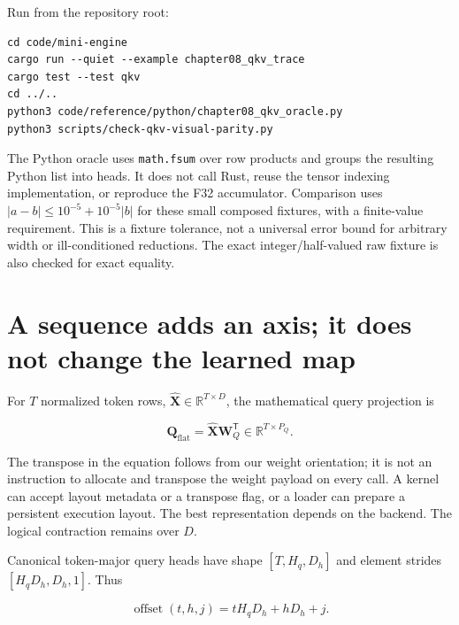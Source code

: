Run from the repository root:

\begin{verbatim}
cd code/mini-engine
cargo run --quiet --example chapter08_qkv_trace
cargo test --test qkv
cd ../..
python3 code/reference/python/chapter08_qkv_oracle.py
python3 scripts/check-qkv-visual-parity.py
\end{verbatim}

The Python oracle uses \texttt{math.fsum} over row products and groups
the resulting Python list into heads. It does not call Rust, reuse the
tensor indexing implementation, or reproduce the F32 accumulator.
Comparison uses \(|a-b|\le 10^{-5}+10^{-5}|b|\) for these small composed
fixtures, with a finite-value requirement. This is a fixture tolerance,
not a universal error bound for arbitrary width or ill-conditioned
reductions. The exact integer/half-valued raw fixture is also checked
for exact equality.

\section{A sequence adds an axis; it does not change the learned
map}\label{a-sequence-adds-an-axis-it-does-not-change-the-learned-map}


For \(T\) normalized token rows,
\(\widehat{\mathbf{X}}\in\mathbb{R}^{T\times D}\), the mathematical
query projection is

\begin{equation}
\mathbf{Q}_{\mathrm{flat}}=
\widehat{\mathbf{X}}\mathbf{W}_Q^{\mathsf T}
\in\mathbb{R}^{T\times P_Q}.
\end{equation}

The transpose in the equation follows from our weight orientation; it is
not an instruction to allocate and transpose the weight payload on every
call. A kernel can accept layout metadata or a transpose flag, or a
loader can prepare a persistent execution layout. The best
representation depends on the backend. The logical contraction remains
over \(D\).

Canonical token-major query heads have shape \([T,H_q,D_h]\) and element
strides \([H_qD_h,D_h,1]\). Thus

\begin{equation}
\operatorname{offset}(t,h,j)=tH_qD_h+hD_h+j.
\end{equation}


